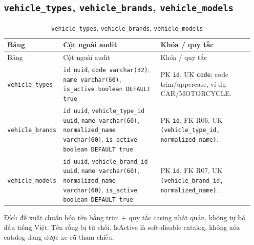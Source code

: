 \subsection{\texttt{vehicle\_\allowbreak{}types}, \texttt{vehicle\_\allowbreak{}brands}, \texttt{vehicle\_\allowbreak{}models}}
\begin{smalltable}\begin{longtable}{L{3.0cm}L{3.2cm}L{8.2cm}}
\caption{\texttt{vehicle\_\allowbreak{}types}, \texttt{vehicle\_\allowbreak{}brands}, \texttt{vehicle\_\allowbreak{}models}}\label{tab:dictionary-5}\\\toprule
Bảng & Cột ngoài audit & Khóa / quy tắc\\\midrule\endfirsthead
\toprule Bảng & Cột ngoài audit & Khóa / quy tắc\\\midrule\endhead
\texttt{vehicle\_\allowbreak{}types} & \texttt{id uuid}, \texttt{code varchar(32)}, \texttt{name varchar(60)}, \texttt{is\_\allowbreak{}active boolean DEFAULT true} & PK \texttt{id}, UK \texttt{code}; code trim/uppercase, ví dụ CAR/MOTORCYCLE.\\
\texttt{vehicle\_\allowbreak{}brands} & \texttt{id uuid}, \texttt{vehicle\_\allowbreak{}type\_\allowbreak{}id uuid}, \texttt{name varchar(60)}, \texttt{normalized\_\allowbreak{}name varchar(60)}, \texttt{is\_\allowbreak{}active boolean DEFAULT true} & PK \texttt{id}, FK R06, UK \texttt{(vehicle\_\allowbreak{}type\_\allowbreak{}id,\allowbreak{} normalized\_\allowbreak{}name)}.\\
\texttt{vehicle\_\allowbreak{}models} & \texttt{id uuid}, \texttt{vehicle\_\allowbreak{}brand\_\allowbreak{}id uuid}, \texttt{name varchar(60)}, \texttt{normalized\_\allowbreak{}name varchar(60)}, \texttt{is\_\allowbreak{}active boolean DEFAULT true} & PK \texttt{id}, FK R07, UK \texttt{(vehicle\_\allowbreak{}brand\_\allowbreak{}id,\allowbreak{} normalized\_\allowbreak{}name)}.\\
\bottomrule\end{longtable}\end{smalltable}
Đích đề xuất chuẩn hóa tên bằng trim + quy tắc casing nhất quán, không tự bỏ dấu tiếng Việt. Tên rỗng bị từ chối. IsActive là soft-disable catalog, không xóa catalog đang được xe cũ tham chiếu.\par
